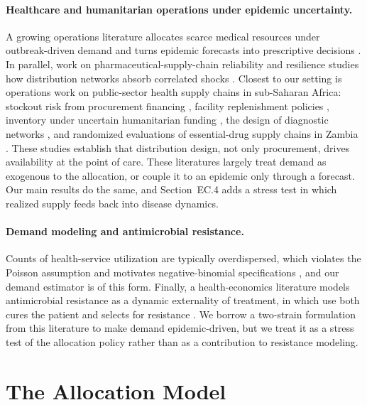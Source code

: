 \documentclass[11pt]{article}
\begin{document}
\paragraph{Healthcare and humanitarian operations under epidemic uncertainty.}
A growing operations literature allocates scarce medical resources under outbreak-driven demand \citep{govindan20} and turns epidemic forecasts into prescriptive decisions \citep{bertsimas21}.
In parallel, work on pharmaceutical-supply-chain reliability and resilience studies how distribution networks absorb correlated shocks \citep{tkr22,ivanov22}.
Closest to our setting is operations work on public-sector health supply chains in sub-Saharan Africa: stockout risk from procurement financing \citep{gallien17}, facility replenishment policies \citep{gallien21}, inventory under uncertain humanitarian funding \citep{natarajan14}, the design of diagnostic networks \citep{deosohoni15,jonasson17}, and randomized evaluations of essential-drug supply chains in Zambia \citep{leung16,vledder19}.
These studies establish that distribution design, not only procurement, drives availability at the point of care.
These literatures largely treat demand as exogenous to the allocation, or couple it to an epidemic only through a forecast.
Our main results do the same, and Section~EC.4 adds a stress test in which realized supply feeds back into disease dynamics.

\paragraph{Demand modeling and antimicrobial resistance.}
Counts of health-service utilization are typically overdispersed, which violates the Poisson assumption and motivates negative-binomial specifications \citep{sec2017,ab2022,rath2024}, and our demand estimator is of this form.
Finally, a health-economics literature models antimicrobial resistance as a dynamic externality of treatment, in which use both cures the patient and selects for resistance \citep{lax01,kd20}.
We borrow a two-strain formulation from this literature to make demand epidemic-driven, but we treat it as a stress test of the allocation policy rather than as a contribution to resistance modeling.

\section{The Allocation Model}
\label{sec:model}
\end{document}
